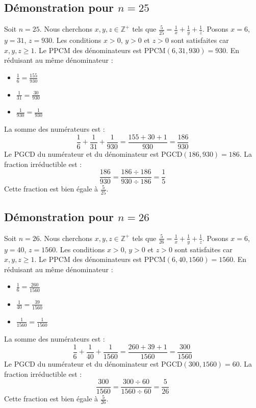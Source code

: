 \documentclass[11pt,a4paper]{article}
\begin{document}
\subsection{Démonstration pour $n = 25$}
Soit $n = 25$. Nous cherchons $x, y, z \in \mathbb{Z}^{+}$ tels que $\frac{5}{25} = \frac{1}{x} + \frac{1}{y} + \frac{1}{z}$.
Posons $x = 6$, $y = 31$, $z = 930$.
Les conditions $x > 0$, $y > 0$ et $z > 0$ sont satisfaites car $x, y, z \geq 1$.
Le PPCM des dénominateurs est $\text{PPCM}(6, 31, 930) = 930$.
En réduisant au même dénominateur :
\begin{itemize}
    \item $\frac{1}{6} = \frac{155}{930}$
    \item $\frac{1}{31} = \frac{30}{930}$
    \item $\frac{1}{930} = \frac{1}{930}$
\end{itemize}
La somme des numérateurs est :
$$ \frac{1}{6} + \frac{1}{31} + \frac{1}{930} = \frac{155 + 30 + 1}{930} = \frac{186}{930} $$
Le PGCD du numérateur et du dénominateur est $\text{PGCD}(186, 930) = 186$.
La fraction irréductible est :
$$ \frac{186}{930} = \frac{186 \div 186}{930 \div 186} = \frac{1}{5} $$
Cette fraction est bien égale à $\frac{5}{25}$.

\subsection{Démonstration pour $n = 26$}
Soit $n = 26$. Nous cherchons $x, y, z \in \mathbb{Z}^{+}$ tels que $\frac{5}{26} = \frac{1}{x} + \frac{1}{y} + \frac{1}{z}$.
Posons $x = 6$, $y = 40$, $z = 1560$.
Les conditions $x > 0$, $y > 0$ et $z > 0$ sont satisfaites car $x, y, z \geq 1$.
Le PPCM des dénominateurs est $\text{PPCM}(6, 40, 1560) = 1560$.
En réduisant au même dénominateur :
\begin{itemize}
    \item $\frac{1}{6} = \frac{260}{1560}$
    \item $\frac{1}{40} = \frac{39}{1560}$
    \item $\frac{1}{1560} = \frac{1}{1560}$
\end{itemize}
La somme des numérateurs est :
$$ \frac{1}{6} + \frac{1}{40} + \frac{1}{1560} = \frac{260 + 39 + 1}{1560} = \frac{300}{1560} $$
Le PGCD du numérateur et du dénominateur est $\text{PGCD}(300, 1560) = 60$.
La fraction irréductible est :
$$ \frac{300}{1560} = \frac{300 \div 60}{1560 \div 60} = \frac{5}{26} $$
Cette fraction est bien égale à $\frac{5}{26}$.
\end{document}
